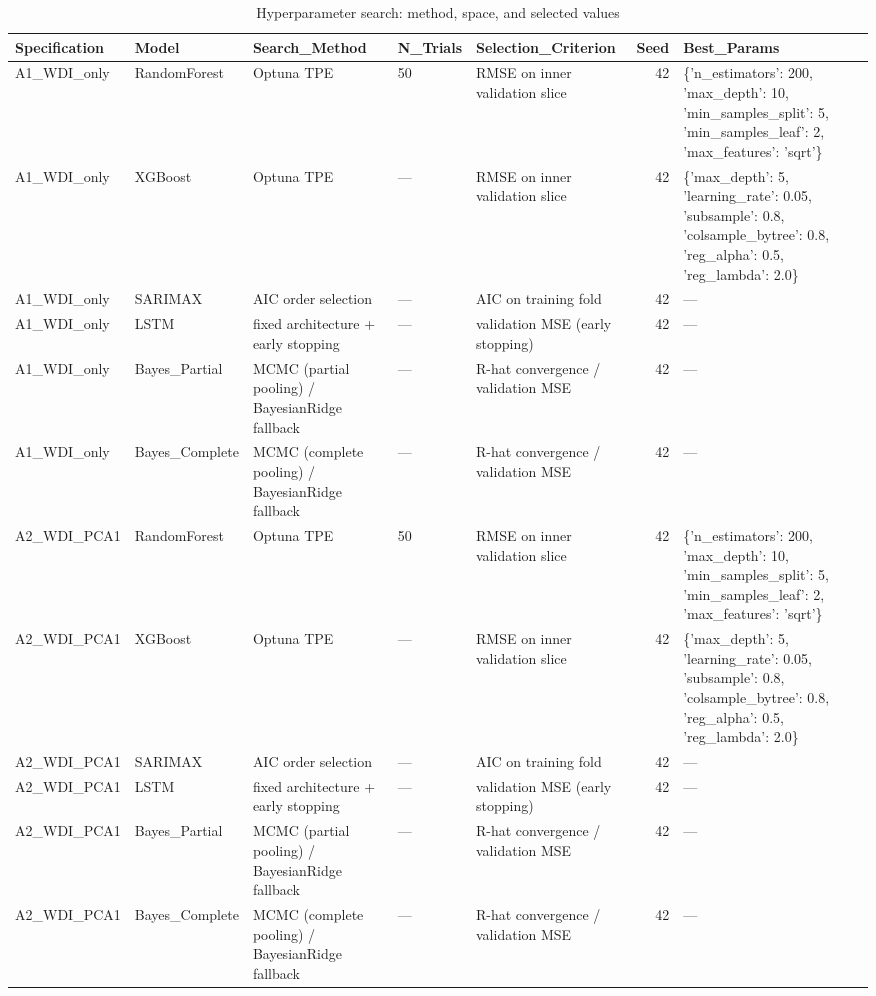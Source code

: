 \begin{table}
\caption{Hyperparameter search: method, space, and selected values}
\label{tab:hyperparameters}
\begin{tabular}{lllllrl}
\toprule
Specification & Model & Search\_Method & N\_Trials & Selection\_Criterion & Seed & Best\_Params \\
\midrule
A1\_WDI\_only & RandomForest & Optuna TPE & 50 & RMSE on inner validation slice & 42 & \{'n\_estimators': 200, 'max\_depth': 10, 'min\_samples\_split': 5, 'min\_samples\_leaf': 2, 'max\_features': 'sqrt'\} \\
A1\_WDI\_only & XGBoost & Optuna TPE & — & RMSE on inner validation slice & 42 & \{'max\_depth': 5, 'learning\_rate': 0.05, 'subsample': 0.8, 'colsample\_bytree': 0.8, 'reg\_alpha': 0.5, 'reg\_lambda': 2.0\} \\
A1\_WDI\_only & SARIMAX & AIC order selection & — & AIC on training fold & 42 & — \\
A1\_WDI\_only & LSTM & fixed architecture + early stopping & — & validation MSE (early stopping) & 42 & — \\
A1\_WDI\_only & Bayes\_Partial & MCMC (partial pooling) / BayesianRidge fallback & — & R-hat convergence / validation MSE & 42 & — \\
A1\_WDI\_only & Bayes\_Complete & MCMC (complete pooling) / BayesianRidge fallback & — & R-hat convergence / validation MSE & 42 & — \\
A2\_WDI\_PCA1 & RandomForest & Optuna TPE & 50 & RMSE on inner validation slice & 42 & \{'n\_estimators': 200, 'max\_depth': 10, 'min\_samples\_split': 5, 'min\_samples\_leaf': 2, 'max\_features': 'sqrt'\} \\
A2\_WDI\_PCA1 & XGBoost & Optuna TPE & — & RMSE on inner validation slice & 42 & \{'max\_depth': 5, 'learning\_rate': 0.05, 'subsample': 0.8, 'colsample\_bytree': 0.8, 'reg\_alpha': 0.5, 'reg\_lambda': 2.0\} \\
A2\_WDI\_PCA1 & SARIMAX & AIC order selection & — & AIC on training fold & 42 & — \\
A2\_WDI\_PCA1 & LSTM & fixed architecture + early stopping & — & validation MSE (early stopping) & 42 & — \\
A2\_WDI\_PCA1 & Bayes\_Partial & MCMC (partial pooling) / BayesianRidge fallback & — & R-hat convergence / validation MSE & 42 & — \\
A2\_WDI\_PCA1 & Bayes\_Complete & MCMC (complete pooling) / BayesianRidge fallback & — & R-hat convergence / validation MSE & 42 & — \\

\end{tabular}
\end{table}
